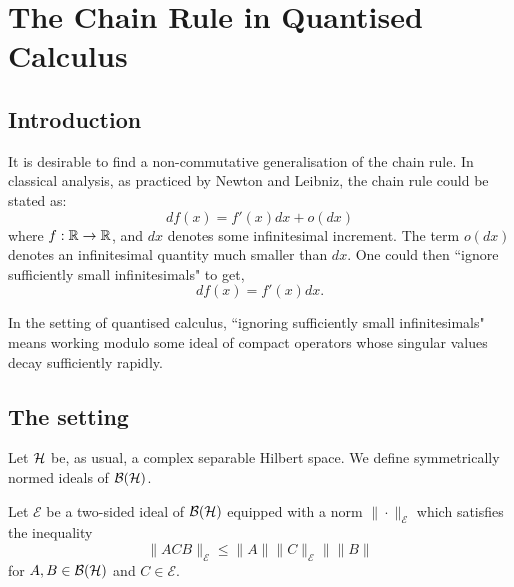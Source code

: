 
\chapter{The Chain Rule in Quantised Calculus} %

\label{TheChainRule} %



\section{Introduction}

 It is desirable
to find a non-commutative generalisation of the chain rule. In classical analysis,
as practiced by Newton and Leibniz, the chain rule could be stated as:
\begin{equation}
\label{classicalChainRule}
    df(x) = f'(x)dx+o(dx)
\end{equation}
where $f:\mathbb{R}\to\mathbb{R}$, and $dx$ denotes some infinitesimal increment.
The term $o(dx)$ denotes an infinitesimal quantity much smaller than $dx$. 
One could then ``ignore sufficiently small infinitesimals" to get,
\begin{equation}
    df(x) = f'(x)dx.
\end{equation}  

In the setting of quantised calculus, ``ignoring sufficiently small infinitesimals"
means working modulo some ideal of compact operators whose singular values
decay sufficiently rapidly.


\section{The setting}
Let $\mathcal{H}$ be, as usual, a complex separable Hilbert space. We
define symmetrically normed ideals of $\mathcal{B}(\mathcal{H})$.
\begin{definition}
    Let $\mathcal{E}$ be a two-sided ideal of $\mathcal{B}(\mathcal{H})$
    equipped with a norm $\|\cdot\|_{\mathcal{E}}$ which satisfies the inequality
    \begin{equation}
        \|ACB\|_{\mathcal{E}} \leq \|A\|\|C\|_\mathcal{E}\|\|B\|
    \end{equation}
    for $A,B \in \mathcal{B}(\mathcal{H})$ and $C \in \mathcal{E}$.
\end{definition}

